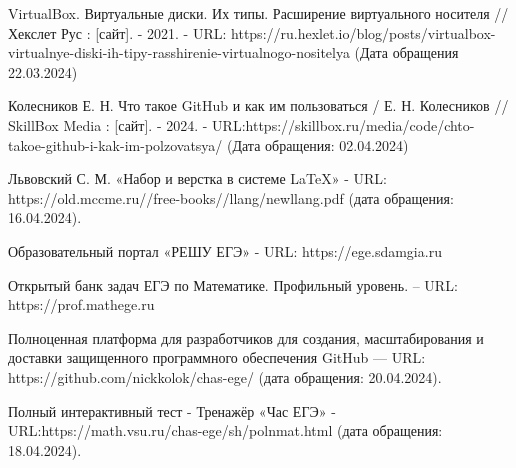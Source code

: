 \begin{thebibliography}{99}

VirtualBox. Виртуальные диски. Их типы. Расширение виртуального носителя // Хекслет Рус : [сайт]. - 2021. - URL: https://ru.hexlet.io/blog/posts/virtualbox-virtualnye-diski-ih-tipy-rasshirenie-virtualnogo-nositelya (Дата обращения 22.03.2024)

Колесников Е. Н. Что такое GitHub и как им пользоваться / Е. Н. Колесников // SkillBox Media : [сайт]. - 2024. - URL:https://skillbox.ru/media/code/chto-takoe-github-i-kak-im-polzovatsya/ (Дата обращения: 02.04.2024)

Львовский С. М. «Набор и верстка в системе LaTeX» - URL: https://old.mccme.ru//free-books//llang/newllang.pdf (дата обращения: 16.04.2024).

Образовательный портал «РЕШУ ЕГЭ» - URL: https://ege.sdamgia.ru 

Открытый банк задач ЕГЭ по Математике. Профильный уровень. – URL: https://prof.mathege.ru

Полноценная платформа для разработчиков для создания, масштабирования и доставки защищенного программного обеспечения GitHub — URL: https://github.com/nickkolok/chas-ege/ (дата обращения: 20.04.2024).  


Полный интерактивный тест - Тренажёр «Час ЕГЭ» - URL:https://math.vsu.ru/chas-ege/sh/polnmat.html (дата обращения: 18.04.2024).
\end{thebibliography}
